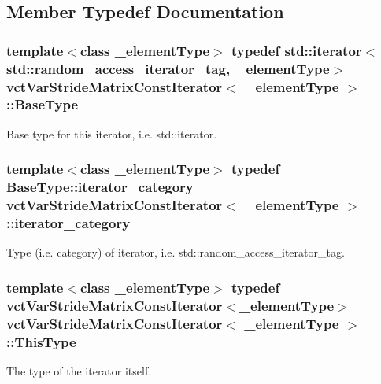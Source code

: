 \subsection{Member Typedef Documentation}
\hypertarget{classvct_var_stride_matrix_const_iterator_af92f59f70debf8b2ac92e032621a9b1e}{}
\subsubsection[{Base\+Type}]{\setlength{\rightskip}{0pt plus 5cm}template$<$class \+\_\+element\+Type$>$ typedef std\+::iterator$<$std\+::random\+\_\+access\+\_\+iterator\+\_\+tag, \+\_\+element\+Type$>$ {\bf vct\+Var\+Stride\+Matrix\+Const\+Iterator}$<$ \+\_\+element\+Type $>$\+::{\bf Base\+Type}}\label{classvct_var_stride_matrix_const_iterator_af92f59f70debf8b2ac92e032621a9b1e}
Base type for this iterator, i.\+e. std\+::iterator. \hypertarget{classvct_var_stride_matrix_const_iterator_a1620d069cfd9a2016c871fa2b5fde20a}{}
\subsubsection[{iterator\+\_\+category}]{\setlength{\rightskip}{0pt plus 5cm}template$<$class \+\_\+element\+Type$>$ typedef Base\+Type\+::iterator\+\_\+category {\bf vct\+Var\+Stride\+Matrix\+Const\+Iterator}$<$ \+\_\+element\+Type $>$\+::{\bf iterator\+\_\+category}}\label{classvct_var_stride_matrix_const_iterator_a1620d069cfd9a2016c871fa2b5fde20a}
Type (i.\+e. category) of iterator, i.\+e. std\+::random\+\_\+access\+\_\+iterator\+\_\+tag. \hypertarget{classvct_var_stride_matrix_const_iterator_af68182ea2024c532e999fd1333cb0c6e}{}
\subsubsection[{This\+Type}]{\setlength{\rightskip}{0pt plus 5cm}template$<$class \+\_\+element\+Type$>$ typedef {\bf vct\+Var\+Stride\+Matrix\+Const\+Iterator}$<$\+\_\+element\+Type$>$ {\bf vct\+Var\+Stride\+Matrix\+Const\+Iterator}$<$ \+\_\+element\+Type $>$\+::{\bf This\+Type}}\label{classvct_var_stride_matrix_const_iterator_af68182ea2024c532e999fd1333cb0c6e}
The type of the iterator itself. 

